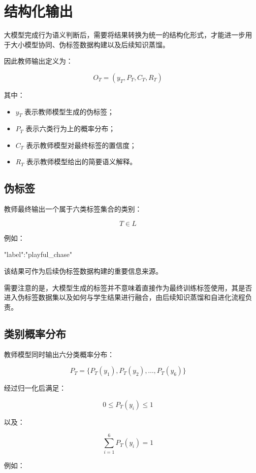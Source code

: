 \section{结构化输出}

大模型完成行为语义判断后，需要将结果转换为统一的结构化形式，才能进一步用于大小模型协同、伪标签数据构建以及后续知识蒸馏。

因此教师输出定义为：

\[
O_T=
\left(
y_T,
P_T,
C_T,
R_T
\right)
\]

其中：

\begin{itemize}
\item \(y_T\) 表示教师模型生成的伪标签；
\item \(P_T\) 表示六类行为上的概率分布；
\item \(C_T\) 表示教师模型对最终标签的置信度；
\item \(R_T\) 表示教师模型给出的简要语义解释。
\end{itemize}

\subsection{伪标签}

教师最终输出一个属于六类标签集合的类别：

\[
T\in L
\]

例如：

\begin{NotionCode}
"label":"playful_chase"
\end{NotionCode}

该结果可作为后续伪标签数据构建的重要信息来源。

需要注意的是，大模型生成的标签并不意味着直接作为最终训练标签使用，其是否进入伪标签数据集以及如何与学生结果进行融合，由后续知识蒸馏和自进化流程负责。

\subsection{类别概率分布}

教师模型同时输出六分类概率分布：

\[
P_T=
\{
P_T(y_1),
P_T(y_2),
\ldots,
P_T(y_6)
\}
\]

经过归一化后满足：

\[
0\leq P_T(y_i)\leq1
\]

以及：

\[
\sum_{i=1}^{6}P_T(y_i)=1
\]

例如：

